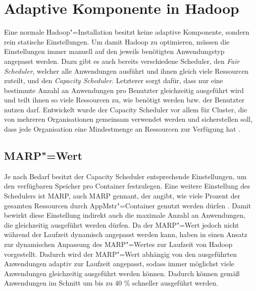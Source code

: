 \section{Adaptive Komponente in Hadoop}
\label{sec:inriaSetting}

Eine normale Hadoop"=Installation besitzt keine adaptive Komponente, sondern rein statische Einstellungen.
Um damit Hadoop zu optimieren, müssen die Einstellungen immer manuell auf den jeweils benötigten Anwendungstyp angepasst werden.
Dazu gibt es auch bereits verschiedene Scheduler, den \emph{Fair Scheduler}, welcher alle Anwendungen ausführt und ihnen gleich viele Ressourcen zuteilt, und den \emph{Capacity Scheduler}.
Letzterer sorgt dafür, dass nur eine bestimmte Anzahl an Anwendungen pro Benutzter gleichzeitig ausgeführt wird und teilt ihnen so viele Ressourcen zu, wie benötigt werden bzw. der Benutzter nutzen darf.
Entwickelt wurde der Capacity Scheduler vor allem für Cluster, die von mehreren Organisationen gemeinsam verwendet werden und sicherstellen soll, dass jede Organisation eine Mindestmenge an Ressourcen zur Verfügung hat \cite{HadoopCapScheduler271}.

\subsection{MARP"=Wert}
\label{sec:selfbalancingMarp}

Je nach Bedarf besitzt der Capacity Scheduler entsprechende Einstellungen, um \zB den verfügbaren Speicher pro Container festzulegen.
Eine weitere Einstellung des Schedulers ist \acl{MARP}, auch \acs{MARP} gennant, der angibt, wie viele Prozent der gesamten Ressourcen durch \ac{AppMstr}"=Container genutzt werden dürfen \cite{HadoopCapScheduler271}.
Damit bewirkt diese Einstellung indirekt auch die maximale Anzahl an Anwendungen, die gleichzeitig ausgeführt werden dürfen.
Da der \ac{MARP}"=Wert jedoch nicht während der Laufzeit dynamisch angepasst werden kann, haben \citeauthor{zhang2016} in \cite{zhang2016} einen Ansatz zur dynamischen Anpassung des \ac{MARP}"=Wertes zur Laufzeit von Hadoop vorgestellt.
Dadurch wird der \ac{MARP}"=Wert abhängig von den ausgeführten Anwendungen adaptiv zur Laufzeit angepasst, sodass immer möglichst viele Anwendungen gleichzeitig ausgeführt werden können.
Dadurch können gemäß \cite{zhang2016} Anwendungen im Schnitt um bis zu 40 \% schneller ausgeführt werden.

